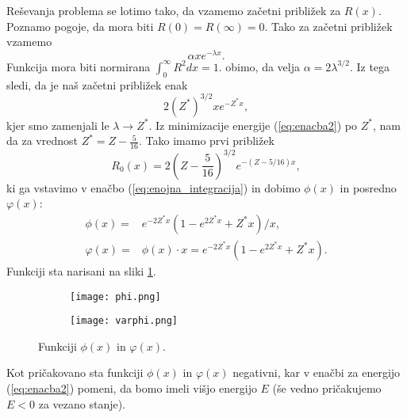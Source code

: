 \documentclass[12pt,a4paper]{article}
\begin{document}
Reševanja problema se lotimo tako, da vzamemo začetni približek za $R(x)$. Poznamo pogoje, da mora biti $R(0)=R(\infty)=0$. Tako za začetni približek vzamemo
\begin{equation*}
\alpha x e^{-\lambda x}.
\end{equation*}
Funkcija mora biti normirana $\int _0 ^{\infty }R^{2} dx=1$. obimo, da velja $\alpha = 2\lambda ^{3/2}$. Iz tega sledi, da je naš začetni približek enak
\begin{equation}
2 (Z^{*}) ^{3/2} x e^{-Z^{*} x},
\end{equation}
kjer smo zamenjali le $\lambda \rightarrow Z^{*}$. Iz minimizacije energije (\ref{eq:enacba2}) po $Z^{*}$, nam da za vrednost $Z^{*}= Z- \frac{5}{16}$. Tako imamo prvi približek
\begin{equation}
R_0 (x)= 2 \left(Z-\frac{5}{16}\right)^{3/2}e^{-(Z-5/16)x},
\end{equation}
ki ga vstavimo v enačbo (\ref{eq:enojna_integracija}) in dobimo $\phi(x)$ in posredno $\varphi(x)$:
\begin{align*}
\phi(x)= & e^{-2Z^{*}x} (1- e^{2Z^{*}x} +Z^{*}x)/x, \\
\varphi(x)= & \phi(x) \cdot x = e^{-2Z^{*}x} (1- e^{2Z^{*}x} +Z^{*}x).
\end{align*}
Funkciji sta narisani na sliki \ref{fig:slika1}.

\begin{figure}[H]
    \centering
    \begin{subfigure}[b]{0.49\textwidth}
        \texttt{[image: phi.png]}
    \end{subfigure}
    \begin{subfigure}[b]{0.49\textwidth}
        \texttt{[image: varphi.png]}
    \end{subfigure}
    \caption{Funkciji $\phi(x)$ in $\varphi(x)$.} \label{fig:slika1}
\end{figure}
\noindent Kot pričakovano sta funkciji $\phi(x)$ in $\varphi(x)$ negativni, kar v enačbi za energijo (\ref{eq:enacba2}) pomeni, da bomo imeli višjo energijo $E$ (še vedno pričakujemo $E<0$ za vezano stanje).
\end{document}
